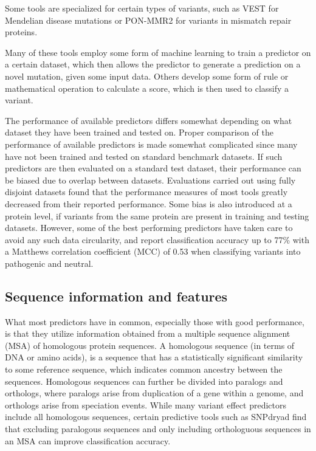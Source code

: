Some tools are specialized for certain types of variants, such as VEST\cite{carter2013identifying} for Mendelian disease mutations or PON-MMR2\cite{niroula2015classification} for variants in mismatch repair proteins.

Many of these tools employ some form of machine learning to train a predictor on a certain dataset, which then allows the predictor to generate a prediction on a novel mutation, given some input data. Others develop some form of rule or mathematical operation to calculate a score, which is then used to classify a variant. 

The performance of available predictors differs somewhat depending on what dataset they have been trained and tested on. Proper comparison of the performance of available predictors is made somewhat complicated since many have not been trained and tested on standard benchmark datasets. If such predictors are then evaluated on a standard test dataset, their performance can be biased due to overlap between datasets. Evaluations carried out using fully disjoint datasets found that the performance measures of most tools greatly decreased from their reported performance.\cite{grimm2015evaluation} Some bias is also introduced at a protein level, if variants from the same protein are present in training and testing datasets.\cite{grimm2015evaluation} However, some of the best performing predictors have taken care to avoid any such data circularity, and report classification accuracy up to 77\% with a Matthews correlation coefficient (MCC) of 0.53\cite{niroula2016variation} when classifying variants into pathogenic and neutral.


\subsection{Sequence information and features}

What most predictors have in common, especially those with good performance, is that they utilize information obtained from a multiple sequence alignment (MSA) of homologous protein sequences.\cite{miosge2015comparison} A homologous sequence (in terms of DNA or amino acids), is a sequence that has a statistically significant similarity to some reference sequence, which indicates common ancestry between the sequences.\cite{pearson2013introduction} Homologous sequences can further be divided into paralogs and orthologs, where paralogs arise from duplication of a gene within a genome, and orthologs arise from speciation events. While many variant effect predictors include all homologous sequences, certain predictive tools such as SNPdryad\cite{wong2014snpdryad} find that excluding paralogous sequences and only including orthologuous sequences in an MSA can improve classification accuracy.

